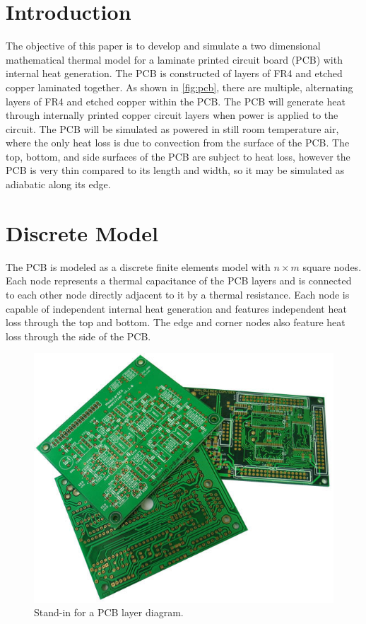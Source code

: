 \documentclass[10pt,twocolumn]{article}
\begin{document}
\section{Introduction}
The objective of this paper is to develop and simulate a two dimensional mathematical thermal model for a laminate printed circuit board (PCB) with internal heat generation. The PCB is constructed of layers of FR4 and etched copper laminated together. As shown in \autoref{fig:pcb}, there are multiple, alternating layers of FR4 and etched copper within the PCB. The PCB will generate heat through internally printed copper circuit layers when power is applied to the circuit. The PCB will be simulated as powered in still room temperature air, where the only heat loss is due to convection from the surface of the PCB. The top, bottom, and side surfaces of the PCB are subject to heat loss, however the PCB is very thin compared to its length and width, so it may be simulated as adiabatic along its edge.

\section{Discrete Model}
The PCB is modeled as a discrete finite elements model with $n \times m$ square nodes. Each node represents a thermal capacitance of the PCB layers and is connected to each other node directly adjacent to it by a thermal resistance. Each node is capable of independent internal heat generation and features independent heat loss through the top and bottom. The edge and corner nodes also feature heat loss through the side of the PCB.

\begin{figure}
	\center
	\includegraphics[width=0.6\linewidth]{pcb}
	\caption{Stand-in for a PCB layer diagram.}
	\label{fig:pcb}
\end{figure}
\end{document}
